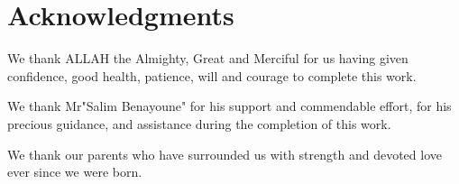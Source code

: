\chapter*{Acknowledgments}





We thank ALLAH the Almighty, Great and Merciful for us having given confidence, good health, patience, will and courage to complete this work.

We thank Mr"Salim Benayoune" for his support and commendable effort, for his precious guidance, and assistance during the completion of this work.

We thank our parents who have surrounded us with strength and devoted love ever since we were born.